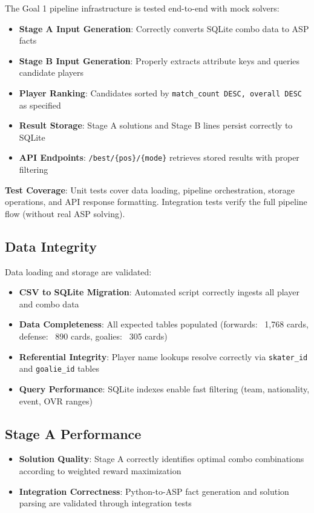 The Goal 1 pipeline infrastructure is tested end-to-end with mock solvers:

\begin{itemize}
    \item \textbf{Stage A Input Generation}: Correctly converts SQLite combo data to ASP facts
    \item \textbf{Stage B Input Generation}: Properly extracts attribute keys and queries candidate players
    \item \textbf{Player Ranking}: Candidates sorted by \texttt{match\_count DESC, overall DESC} as specified
    \item \textbf{Result Storage}: Stage A solutions and Stage B lines persist correctly to SQLite
    \item \textbf{API Endpoints}: \texttt{/best/\{pos\}/\{mode\}} retrieves stored results with proper filtering
\end{itemize}

\textbf{Test Coverage}: Unit tests cover data loading, pipeline orchestration, storage operations, and API response formatting. Integration tests verify the full pipeline flow (without real ASP solving).

\subsection{Data Integrity}

Data loading and storage are validated:

\begin{itemize}
    \item \textbf{CSV to SQLite Migration}: Automated script correctly ingests all player and combo data
    \item \textbf{Data Completeness}: All expected tables populated (forwards: ~1,768 cards, defense: ~890 cards, goalies: ~305 cards)
    \item \textbf{Referential Integrity}: Player name lookups resolve correctly via \texttt{skater\_id} and \texttt{goalie\_id} tables
    \item \textbf{Query Performance}: SQLite indexes enable fast filtering (team, nationality, event, OVR ranges)
\end{itemize}

\subsection{Stage A Performance}

\begin{itemize}
    \item \textbf{Solution Quality}: Stage A correctly identifies optimal combo combinations according to weighted reward maximization
    \item \textbf{Integration Correctness}: Python-to-ASP fact generation and solution parsing are validated through integration tests
\end{itemize}

